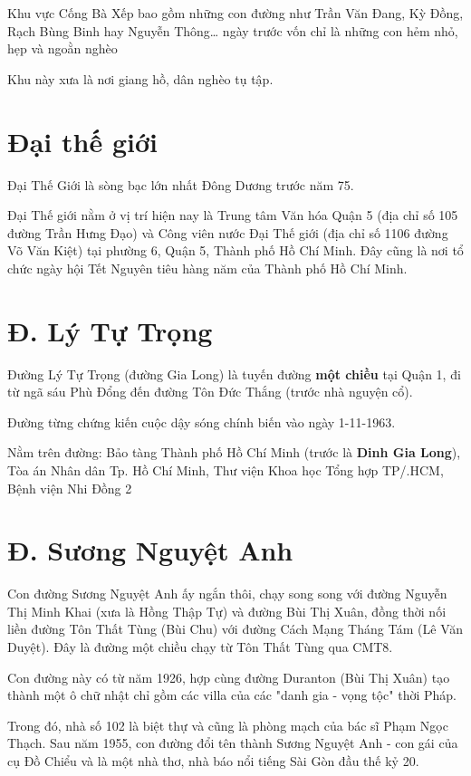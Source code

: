 Khu vực Cống Bà Xếp bao gồm những con đường như Trần Văn Đang, Kỳ Đồng, Rạch Bùng Binh hay Nguyễn Thông… ngày trước vốn chỉ là những con hẻm nhỏ, hẹp và ngoằn nghèo

Khu này xưa là nơi giang hồ, dân nghèo tụ tập.

\section{Đại thế giới}

Đại Thế Giới là sòng bạc lớn nhất Đông Dương trước năm 75.

Đại Thế giới nằm ở vị trí hiện nay là Trung tâm Văn hóa Quận 5 (địa chỉ số 105 đường Trần Hưng Đạo) và Công viên nước Đại Thế giới (địa chỉ số 1106 đường Võ Văn Kiệt) tại phường 6, Quận 5, Thành phố Hồ Chí Minh. Đây cũng là nơi tổ chức ngày hội Tết Nguyên tiêu hàng năm của Thành phố Hồ Chí Minh.

\section{Đ. Lý Tự Trọng}

Đường Lý Tự Trọng (đường Gia Long) là tuyến đường \textbf{một chiều} tại Quận 1, đi từ ngã sáu Phù Đổng đến đường Tôn Đức Thắng (trước nhà nguyện cổ).

Đường từng chứng kiến cuộc dậy sóng chính biến vào ngày 1-11-1963.

Nằm trên đường: Bảo tàng Thành phố Hồ Chí Minh (trước là \textbf{Dinh Gia Long}), Tòa án Nhân dân Tp. Hồ Chí Minh, Thư viện Khoa học Tổng hợp TP/.HCM, Bệnh viện Nhi Đồng 2

\section{Đ. Sương Nguyệt Anh}

Con đường Sương Nguyệt Anh ấy ngắn thôi, chạy song song với đường Nguyễn Thị Minh Khai (xưa là Hồng Thập Tự) và đường Bùi Thị Xuân, đồng thời nối liền đường Tôn Thất Tùng (Bùi Chu) với đường Cách Mạng Tháng Tám (Lê Văn Duyệt). Đây là đường một chiều chạy từ Tôn Thất Tùng qua CMT8.

 Con đường này có từ năm 1926, hợp cùng đường Duranton (Bùi Thị Xuân) tạo thành một ô chữ nhật chỉ gồm các villa của các "danh gia - vọng tộc" thời Pháp.

Trong đó, nhà số 102 là biệt thự và cũng là phòng mạch của bác sĩ Phạm Ngọc Thạch. Sau năm 1955, con đường đổi tên thành Sương Nguyệt Anh - con gái của cụ Đồ Chiểu và là một nhà thơ, nhà báo nổi tiếng Sài Gòn đầu thế kỷ 20.


